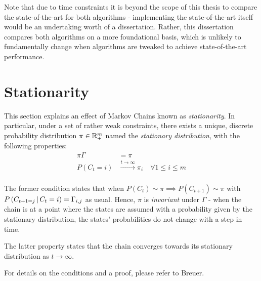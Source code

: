 Note that due to time constraints it is beyond the scope of this thesis to compare the state-of-the-art for both algorithms - implementing the state-of-the-art itself would be an undertaking worth of a dissertation. Rather, this dissertation compares both algorithms on a more foundational basis, which is unlikely to fundamentally change when algorithms are tweaked to achieve state-of-the-art performance. 



\section{Stationarity}
This section explains an effect of Markov Chains known as \textit{stationarity}. In particular, under a set of rather weak constraints\cite{mcnotes}, there exists a unique, discrete probability distribution $\pi \in \mathbb{R}_+^m$ named the \textit{stationary distribution}, with the following properties:
\begin{align*}
	\pi \Gamma &= \pi \\
	P(C_t = i) &\overset{t \rightarrow \infty}{\longrightarrow} \pi_i \quad \forall 1 \leq i \leq m \\
\end{align*}

The former condition states that when $P(C_t) \sim \pi \implies P(C_{t+1}) \sim \pi$ with $P\left(C_{t+1 = j} \, | \, C_t = i\right) = \Gamma_{i, j}$ as usual. Hence, $\pi$ is \textit{invariant} under $\Gamma$ - when the chain is at a point where the states are assumed with a probability given by the stationary distribution, the states' probabilities do not change with a step in time. 

The latter property states that the chain converges towards its stationary distribution as $t \rightarrow \infty$. 

For details on the conditions and a proof, please refer to Breuer\cite{intro_processes}.
